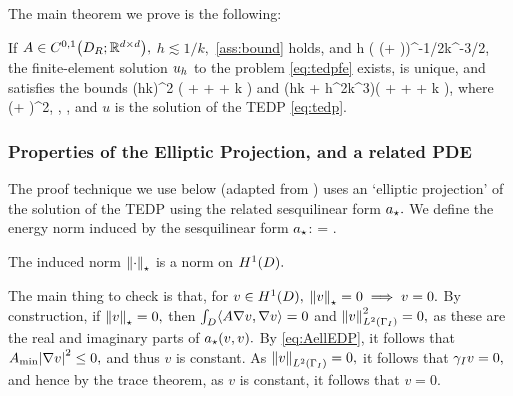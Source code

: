 
The main theorem we prove is the following:

\label{thm:febound}
If $A \in \CzoDRRRdtd,$ $h \lesssim 1/k,$ \cref{ass:bound} holds, and
\beq\label{eq:hcond}
h \lesssim \mleft( \mleft(\Amax + \half\mright)\CHtell \CHthh\mright)^{-1/2}k^{-3/2}, %
\eeq
the finite-element solution $u_{h}$ to the problem \eqref{eq:tedpfe} exists, is unique, and satisfies the bounds
\beq\label{eq:hherrltbound}
 \lesssim \Cfemo \mleft(hk\mright)^2 \mleft( + \Nunsure{\gI} + \NLtGD{\gradGD \gD} + k \NLtGD{\gD}\mright)
\eeq
and
\beq\label{eq:hherrwbound}
 \lesssim \mleft(\Cfemt hk +  \Cfemth h^2k^3\mright)\mleft( + \Nunsure{\gI} + \NLtGD{\gradGD \gD} + k \NLtGD{\gD}\mright),
\eeq
where
\beqs
\Cfemo \de \mleft(\Amax + \half\mright)\CHthh^2,
\eeqs
\beqs
\Cfemt \de \frac{\Amax+\half}{\Amin} \CHthh,
\eeqs
\beqs
\Cfemth \de {}\Cfemo,
\eeqs
and $u$ is the solution of the TEDP \eqref{eq:tedp}.
\enth

\subsubsection{Properties of the Elliptic Projection, and a related PDE}

The proof technique we use below (adapted from \cite{FeWu:11,ChNi:18}) uses an `elliptic projection' of the solution of the TEDP using the related sesquilinear form $a_{\star}.$ We define the energy norm induced by the sesquilinear form $a_{\star}$:
\beqs
\Npi{\vo} = \sqrt{\abs{\api(\vo,\vo)}}.
\eeqs

\label{lem:inducednorm}
The induced norm $\Npi{\cdot}$ is a norm on $\HoD.$
\ele

The main thing to check is that, for $v \in \HoD,$ $\Npi{v}=0 \implies v=0.$ By construction, if $\Npi{v}=0,$ then $\int_{D} \IP{A \grad v}{\grad v} =0$ and $\NLtGI{v}^2 = 0,$ as these are the real and imaginary parts of $a_{\star}(v,v).$ By \eqref{eq:AellEDP}, it follows that $\Amin \abs{\grad v}^2 \leq 0,$ and thus $v$ is constant. As $\NLtGI{v} = 0,$ it follows that $\gamma_{I} v =0,$ and hence by the trace theorem, as $v$ is constant, it follows that $v=0.$

